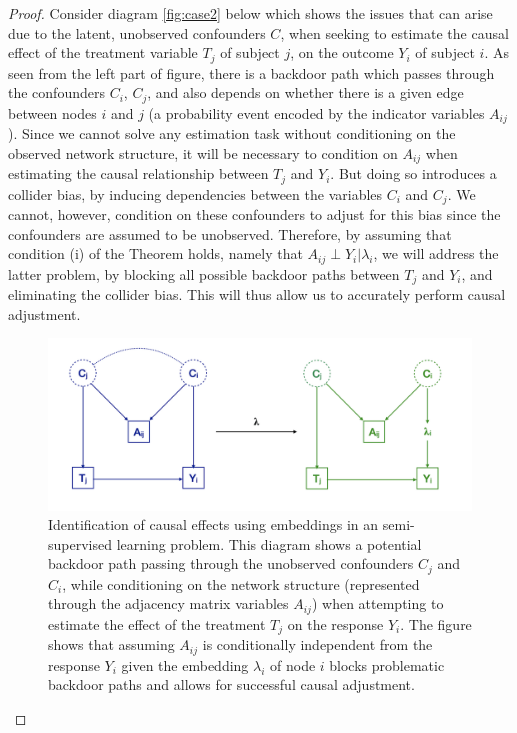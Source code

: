 \documentclass{article}
\begin{document}
\begin{proof}
Consider diagram \ref{fig:case2} below which shows the issues that can arise due to the latent, unobserved confounders $C$, when seeking to estimate the causal effect of the treatment variable $T_j$ of subject $j$, on the outcome $Y_i$ of subject $i$. As seen from the left part of figure, there is a backdoor path which passes through the confounders $C_i$, $C_j$, and also depends on whether there is a given edge between nodes $i$ and $j$ (a probability event encoded by the indicator variables $A_{ij}$). Since we cannot solve any estimation task without conditioning on the observed network structure, it will be necessary to condition on $A_{ij}$ when estimating the causal relationship between $T_j$ and $Y_i$. But doing so introduces a collider bias, by inducing dependencies between the variables $C_i$ and $C_j$. We cannot, however, condition on these confounders to adjust for this bias since the confounders are assumed to be unobserved. Therefore, by assuming that condition (i) of the Theorem holds, namely that $A_{ij} \perp Y_i | \lambda_i$, we will address the latter problem, by blocking all possible backdoor paths between $T_j$ and $Y_i$, and eliminating the collider bias. This will thus allow us to accurately perform causal adjustment. 



\begin{figure}
  \includegraphics[width=\linewidth]{case1.png}
  \caption{Identification of causal effects using embeddings in an semi-supervised learning problem. This diagram shows a potential backdoor path passing through the unobserved confounders $C_j$ and $C_i$, while conditioning on the network structure (represented through the adjacency matrix variables $A_{ij}$) when attempting to estimate the effect of the treatment $T_j$ on the response $Y_i$. The figure shows that assuming $A_{ij}$ is conditionally independent from the response $Y_i$ given the embedding $\lambda_i$ of node $i$ blocks problematic backdoor paths and allows for successful causal adjustment.}
  \label{fig:case1}
\end{figure}
\end{proof}
\end{document}
